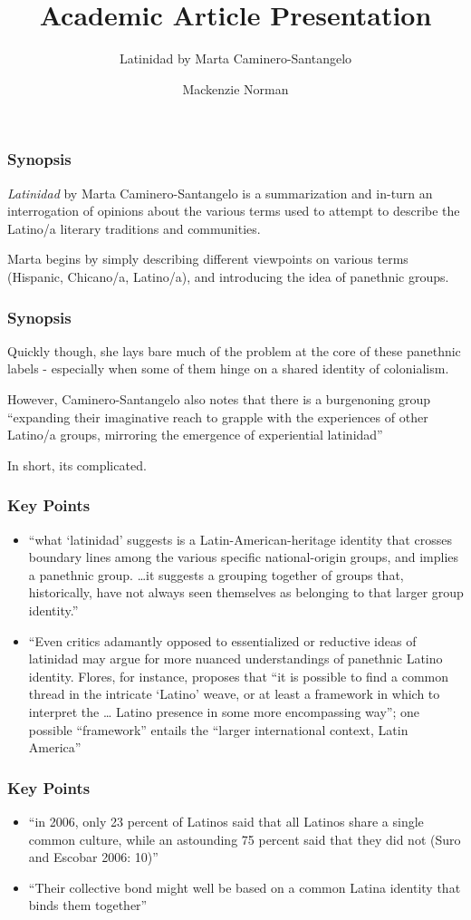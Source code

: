 \documentclass[professionalfont]{beamer}
\title{Academic Article Presentation}
\subtitle{Latinidad by Marta Caminero-Santangelo}
\author{Mackenzie Norman}
\begin{document}
\frame{\titlepage}

\begin{frame}
\frametitle{Synopsis}
\textit{Latinidad} by Marta Caminero-Santangelo is a summarization and in-turn an interrogation of opinions about the various terms used to attempt to describe the Latino/a literary traditions and communities. 

Marta begins by simply describing different viewpoints on various terms (Hispanic, Chicano/a, Latino/a), and introducing the idea of panethnic groups.
\end{frame}
\begin{frame}
\frametitle{Synopsis}
Quickly though, she lays bare much of the problem at the core of these panethnic labels - especially when some of them hinge on a shared identity of colonialism.

However, Caminero-Santangelo also notes that there is a burgenoning group ``expanding their imaginative reach to grapple with the experiences of other Latino/a groups, mirroring the emergence of experiential latinidad''

In short, its complicated.
\end{frame}
\begin{frame}
\frametitle{Key Points}
\begin{itemize}
    \item ``what `latinidad' suggests is a Latin-American-heritage identity that crosses boundary lines among the various specific national-origin groups, and implies a panethnic group. \dots it suggests a grouping together of groups that, historically, have not always seen themselves as belonging to that larger group identity.''
    
    \item ``Even critics adamantly opposed to essentialized or reductive ideas of latinidad may argue for more nuanced understandings of panethnic Latino identity. Flores, for instance, proposes that “it is possible to find a common thread in the intricate ‘Latino’ weave, or at least a framework in which to interpret the … Latino presence in some more encompassing way”; one possible “framework” entails the “larger international context, Latin America''
\end{itemize}
\end{frame}
\begin{frame}
    \frametitle{Key Points}
\begin{itemize}
   \item ``in 2006, only 23 percent of Latinos said that all Latinos share a single common culture, while an astounding 75 percent said that they did not (Suro and Escobar 2006: 10)''
   \item ``Their collective bond might well be based on a common Latina identity that binds them together''
   
\end{itemize}
\end{frame}
\end{document}
